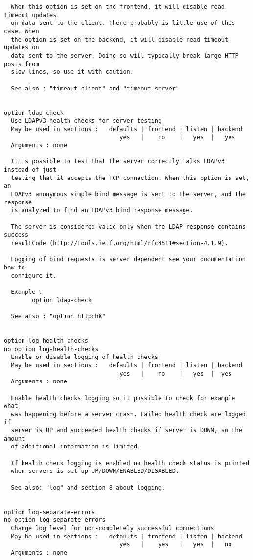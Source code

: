 \begin{verbatim}
  When this option is set on the frontend, it will disable read timeout updates
  on data sent to the client. There probably is little use of this case. When
  the option is set on the backend, it will disable read timeout updates on
  data sent to the server. Doing so will typically break large HTTP posts from
  slow lines, so use it with caution.

  See also : "timeout client" and "timeout server"


option ldap-check
  Use LDAPv3 health checks for server testing
  May be used in sections :   defaults | frontend | listen | backend
                                 yes   |    no    |   yes  |   yes
  Arguments : none

  It is possible to test that the server correctly talks LDAPv3 instead of just
  testing that it accepts the TCP connection. When this option is set, an
  LDAPv3 anonymous simple bind message is sent to the server, and the response
  is analyzed to find an LDAPv3 bind response message.

  The server is considered valid only when the LDAP response contains success
  resultCode (http://tools.ietf.org/html/rfc4511#section-4.1.9).

  Logging of bind requests is server dependent see your documentation how to
  configure it.

  Example :
        option ldap-check

  See also : "option httpchk"


option log-health-checks
no option log-health-checks
  Enable or disable logging of health checks
  May be used in sections :   defaults | frontend | listen | backend
                                 yes   |    no    |   yes  |  yes
  Arguments : none

  Enable health checks logging so it possible to check for example what
  was happening before a server crash. Failed health check are logged if
  server is UP and succeeded health checks if server is DOWN, so the amount
  of additional information is limited.

  If health check logging is enabled no health check status is printed
  when servers is set up UP/DOWN/ENABLED/DISABLED.

  See also: "log" and section 8 about logging.


option log-separate-errors
no option log-separate-errors
  Change log level for non-completely successful connections
  May be used in sections :   defaults | frontend | listen | backend
                                 yes   |    yes   |   yes  |   no
  Arguments : none


\end{verbatim}
